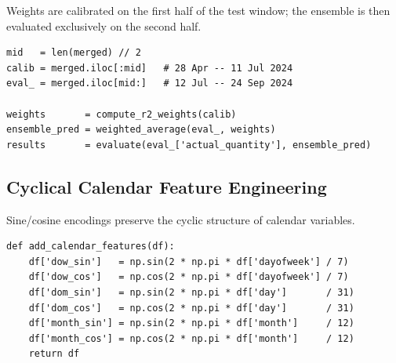 \documentclass[12pt, a4paper]{article}
\begin{document}
Weights are calibrated on the first half of the test window; the ensemble is then
evaluated exclusively on the second half.

\begin{lstlisting}[caption={Leakage-free weighted ensemble calibration and evaluation.},
                   label=lst:weights]
mid   = len(merged) // 2
calib = merged.iloc[:mid]   # 28 Apr -- 11 Jul 2024
eval_ = merged.iloc[mid:]   # 12 Jul -- 24 Sep 2024

weights       = compute_r2_weights(calib)
ensemble_pred = weighted_average(eval_, weights)
results       = evaluate(eval_['actual_quantity'], ensemble_pred)
\end{lstlisting}

\subsection{Cyclical Calendar Feature Engineering}

Sine/cosine encodings preserve the cyclic structure of calendar variables.

\begin{lstlisting}[caption={Cyclical calendar feature generation
                   (\texttt{src/preprocessing.py}).}, label=lst:calendar]
def add_calendar_features(df):
    df['dow_sin']   = np.sin(2 * np.pi * df['dayofweek'] / 7)
    df['dow_cos']   = np.cos(2 * np.pi * df['dayofweek'] / 7)
    df['dom_sin']   = np.sin(2 * np.pi * df['day']       / 31)
    df['dom_cos']   = np.cos(2 * np.pi * df['day']       / 31)
    df['month_sin'] = np.sin(2 * np.pi * df['month']     / 12)
    df['month_cos'] = np.cos(2 * np.pi * df['month']     / 12)
    return df
\end{lstlisting}
\end{document}
